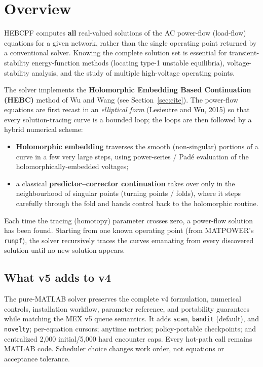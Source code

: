 \documentclass[11pt,a4paper]{article}
\newcommand{\code}[1]{\texttt{#1}}
\begin{document}
\section{Overview}

HEBCPF computes \textbf{all} real-valued solutions of the AC power-flow (load-flow)
equations for a given network, rather than the single operating point returned by a
conventional solver. Knowing the complete solution set is essential for
transient-stability energy-function methods (locating type-1 unstable equilibria),
voltage-stability analysis, and the study of multiple high-voltage operating points.

The solver implements the \textbf{Holomorphic Embedding Based Continuation (HEBC)}
method of Wu and Wang (see Section~\ref{sec:cite}). The power-flow equations are first
recast in an \emph{elliptical form} (Lesieutre and Wu, 2015) so that every
solution-tracing curve is a
bounded loop; the loops are then followed by a hybrid numerical scheme:

\begin{itemize}[leftmargin=1.4em]
  \item \textbf{Holomorphic embedding} traverses the smooth (non-singular) portions of
        a curve in a few very large steps, using power-series / Pad\'e evaluation of the
        holomorphically-embedded voltages;
  \item a classical \textbf{predictor--corrector continuation} takes over only in the
        neighbourhood of singular points (turning points / folds), where it steps
        carefully through the fold and hands control back to the holomorphic routine.
\end{itemize}

Each time the tracing (homotopy) parameter crosses zero, a power-flow solution has been
found. Starting from one known operating point (from MATPOWER's \code{runpf}), the solver
recursively traces the curves emanating from every discovered solution until no new
solution appears.

\subsection{What v5 adds to v4}\label{sec:v4}
The pure-MATLAB solver preserves the complete v4 formulation, numerical controls,
installation workflow, parameter reference, and portability guarantees while matching
the MEX v5 queue semantics. It adds \code{scan}, \code{bandit} (default), and
\code{novelty}; per-equation cursors; anytime metrics; policy-portable checkpoints;
and centralized 2,000 initial/5,000 hard encounter caps. Every hot-path call remains
MATLAB code. Scheduler choice changes work order, not equations or acceptance tolerance.
\end{document}
